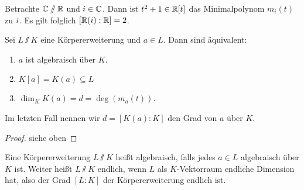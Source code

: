 \documentclass[12pt,a4paper]{scrartcl}
\begin{document}
\begin{bsp}
	Betrachte $\mathbb C\sslash\mathbb R$ und $i\in\mathbb C$. Dann ist $t^2+1\in \mathbb R[t]$ das Minimalpolynom $m_i(t)$ zu $i$. Es gilt folglich $[\mathbb R(i):\mathbb R] = 2$.
\end{bsp}

\begin{satz}\label{thm:algebraisch_aequivalenzen}
	Sei $L\sslash K$ eine Körpererweiterung und $a\in L$. Dann sind äquivalent:
	\begin{enumerate}
		\item $a$ ist algebraisch über $K$.
		\item $K[a] = K(a) \subseteq L$
		\item $\dim_KK(a) = d = \deg(m_a(t))$.
	\end{enumerate}
	Im letzten Fall nennen wir $ d = [K(a):K]$ den Grad von $a$ über $K$.
\end{satz}
\begin{proof}
	siehe oben
\end{proof}
\begin{defi}
	Eine Körpererweiterung $L\sslash K$ heißt algebraisch, falls jedes $a\in L$ algebraisch über $K$ ist. Weiter heißt $L\sslash K$ endlich, wenn $L$ als $K$-Vektorraum endliche Dimension hat, also der Grad $[L:K]$ der Körpererweiterung endlich ist.
\end{defi}	
	
\end{document}
